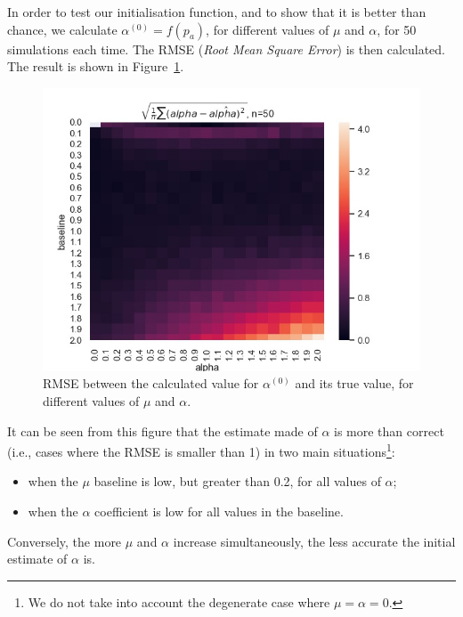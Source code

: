 In order to test our initialisation function, and to show that it is better than chance, we calculate $\alpha^{(0)} = f(p_a)$, for different values of $\mu$ and $\alpha$, for 50 simulations each time.
The RMSE (\textit{Root Mean Square Error}) is then calculated.
The result is shown in Figure~\ref{fig:heatmap_alpha_init_rmse}.

\begin{figure}[h!]
    \centering
    \includegraphics[scale=0.7]{pics/heatmap_baseline_alpha_alpha_init_rmse.jpg}
    \caption{RMSE between the calculated value for $\alpha^{(0)}$ and its true value, for different values of $\mu$ and $\alpha$.}
    \label{fig:heatmap_alpha_init_rmse}
\end{figure}

It can be seen from this figure that the estimate made of $\alpha$ is more than correct (i.e., cases where the RMSE is smaller than 1) in two main situations\footnote{We do not take into account the degenerate case where $\mu = \alpha = $0.}:
\begin{itemize}
    \item when the $\mu$ baseline is low, but greater than 0.2, for all values of $\alpha$; 
    \item when the $\alpha$ coefficient is low for all values in the baseline.
\end{itemize}

Conversely, the more $\mu$ and $\alpha$ increase simultaneously, the less accurate the initial estimate of $\alpha$ is.

